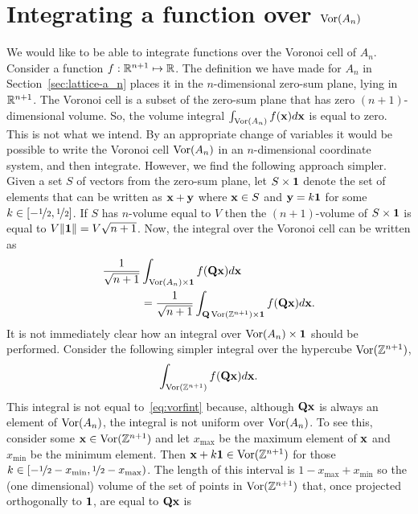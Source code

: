 \documentclass[journal]{IEEEtran}
\begin{document}
\section{Integrating a function over $\operatorname{Vor}(A_n)$}\label{sec:integr-funct-over}

We would like to be able to integrate functions over the Voronoi cell of $A_n$.  Consider a function $f : {\mathbb R}^{n+1} \mapsto {\mathbb R}$.  The definition we have made for $A_n$ in Section~\ref{sec:lattice-a_n} places it in the $n$-dimensional zero-sum plane, lying in ${\mathbb R}^{n+1}$.  The Voronoi cell is a subset of the zero-sum plane that has zero $(n+1)$-dimensional volume.  So, the volume integral $\int_{\operatorname{Vor}(A_n)} f(\mathbf{x}) d \mathbf{x}$ is equal to zero.  This is not what we intend.  By an appropriate change of variables it would be possible to write the Voronoi cell $\operatorname{Vor}(A_n)$ in an $n$-dimensional coordinate system, and then integrate.  However, we find the following approach simpler.  Given a set $S$ of vectors from the zero-sum plane, let $S \times \boldsymbol{1}$ denote the set of elements that can be written as $\mathbf{x} + \mathbf{y}$ where $\mathbf{x} \in S$ and $\mathbf{y} = k\boldsymbol{1}$ for some $k \in [-\nicefrac{1}{2},\nicefrac{1}{2}]$.  If $S$ has $n$-volume equal to $V$ then the $(n+1)$-volume of $S\times\boldsymbol{1}$ is equal to $V\|\boldsymbol{1}\| = V \sqrt{n+1}$.  Now, the integral over the Voronoi cell can be written as
\begin{equation}\label{eq:vorfint}
\begin{split}
\frac{1}{\sqrt{n+1}} &\int_{\vor(A_n) \times \onebf} f(\Qbf\xbf) d\xbf \\
&= \frac{1}{\sqrt{n+1}} \int_{\Qbf\vor(\ints^{n+1}) \times \onebf} f(\Qbf\xbf) d\xbf.
\end{split}
\end{equation}
It is not immediately clear how an integral over $\operatorname{Vor}(A_n) \times \boldsymbol{1}$ should be performed.  Consider the following simpler integral over the hypercube $\operatorname{Vor}({\mathbb Z}^{n+1})$,
\begin{equation}\label{eq:unormalised}
\int_{\vor(\ints^{n+1})} f(\Qbf\xbf) d\xbf.
\end{equation}
This integral is not equal to~\eqref{eq:vorfint} because, although $\mathbf{Q}\mathbf{x}$ is always an element of $\operatorname{Vor}(A_n)$, the integral is not uniform over $\operatorname{Vor}(A_n)$.  To see this, consider some $\mathbf{x} \in \operatorname{Vor}({\mathbb Z}^{n+1})$ and let $x_{\text{max}}$ be the maximum element of $\mathbf{x}$ and $x_{\text{min}}$ be the minimum element.  Then $\mathbf{x} +  k \boldsymbol{1} \in \operatorname{Vor}({\mathbb Z}^{n+1})$ for those $k \in [-\nicefrac{1}{2} - x_{\text{min}}, \nicefrac{1}{2} - x_{\text{max}})$.  The length of this interval is $1 - x_{\text{max}} + x_{\text{min}}$ so the (one dimensional) volume of the set of points in $\operatorname{Vor}({\mathbb Z}^{n+1})$ that, once projected orthogonally to $\boldsymbol{1}$, are equal to $\mathbf{Q}\mathbf{x}$ is
\end{document}
